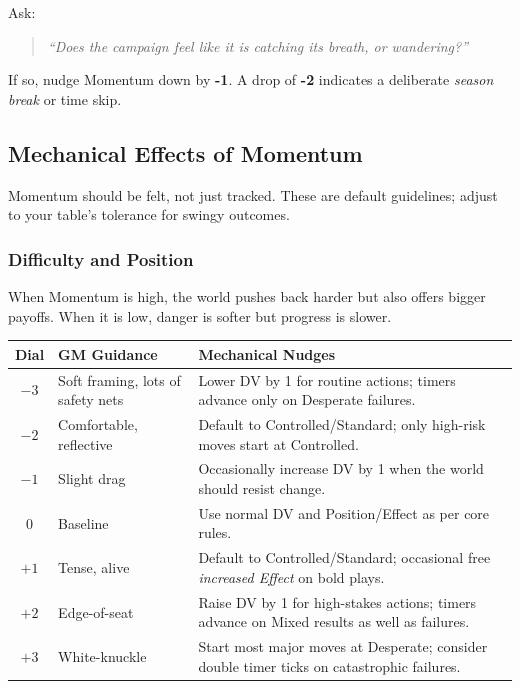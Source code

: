 \documentclass[11pt]{article}
\begin{document}
Ask:
\begin{quote}
\emph{``Does the campaign feel like it is catching its breath, or wandering?''}
\end{quote}
If so, nudge Momentum down by \textbf{-1}. A drop of \textbf{-2} indicates a deliberate \emph{season break} or time skip.

\subsection{Mechanical Effects of Momentum}

Momentum should be felt, not just tracked. These are default guidelines; adjust to your table's tolerance for swingy outcomes.

\subsubsection{Difficulty and Position}

When Momentum is high, the world pushes back harder but also offers bigger payoffs. When it is low, danger is softer but progress is slower.

\begin{center}
\begin{longtable}{|c|p{4cm}|p{6cm}|}
\hline
\textbf{Dial} & \textbf{GM Guidance} & \textbf{Mechanical Nudges} \\
\hline
$-3$ & Soft framing, lots of safety nets & Lower DV by 1 for routine actions; timers advance only on Desperate failures. \\
\hline
$-2$ & Comfortable, reflective & Default to Controlled/Standard; only high-risk moves start at Controlled. \\
\hline
$-1$ & Slight drag & Occasionally increase DV by 1 when the world should resist change. \\
\hline
$0$  & Baseline & Use normal DV and Position/Effect as per core rules. \\
\hline
$+1$ & Tense, alive & Default to Controlled/Standard; occasional free \emph{increased Effect} on bold plays. \\
\hline
$+2$ & Edge-of-seat & Raise DV by 1 for high-stakes actions; timers advance on Mixed results as well as failures. \\
\hline
$+3$ & White-knuckle & Start most major moves at Desperate; consider double timer ticks on catastrophic failures. \\
\hline
\end{longtable}
\end{center}
\end{document}
